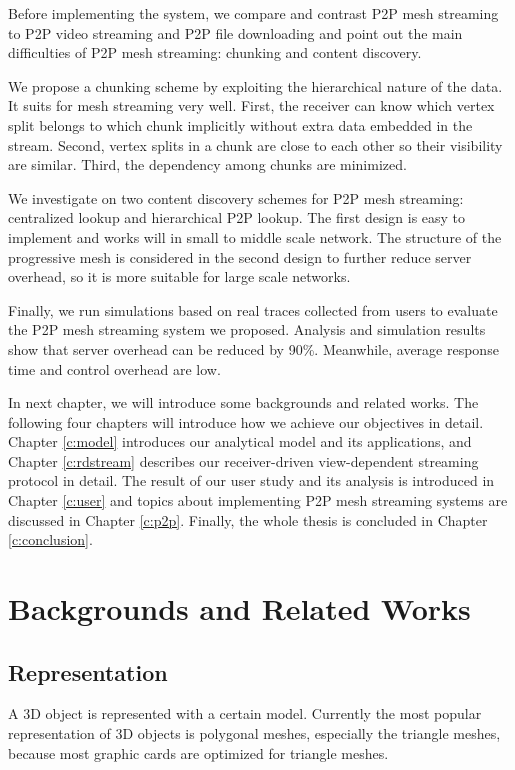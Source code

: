 \documentclass[11pt, a4paper]{report}
\begin{document}
    Before implementing the system, 
    we compare and contrast P2P mesh streaming to P2P
    video streaming and P2P file downloading and point out
    the main difficulties of P2P mesh streaming:  
    chunking and content discovery.

    We propose a chunking scheme by exploiting the hierarchical 
    nature of the data. It suits for mesh streaming very well.
    First, the receiver can know which vertex split belongs to
    which chunk implicitly without extra data embedded in the stream.
    Second, vertex splits in a chunk are close to each other so
    their visibility are similar. Third, the dependency among chunks
    are minimized.

    We investigate on two content discovery schemes for P2P
    mesh streaming: centralized lookup and hierarchical P2P lookup.
    The first design is easy to implement and works will in small to 
    middle scale network. The structure of the progressive
    mesh is considered in the second design to further
    reduce server overhead, so it is more suitable for large scale networks. 
    
    Finally, we run simulations based on real
    traces collected from users to evaluate the P2P
    mesh streaming system we proposed.  Analysis and
    simulation results show that server overhead can be
    reduced by 90\%. Meanwhile,  average response time and
    control overhead are low.

    In next chapter, we will introduce some backgrounds and related works.
    The following four chapters will introduce how we achieve our objectives in detail.
    Chapter \ref{c:model} introduces our analytical model and its applications, and
    Chapter \ref{c:rdstream} describes our receiver-driven view-dependent streaming
    protocol in detail. The result of our user study and its analysis is introduced
    in Chapter \ref{c:user} and topics about implementing P2P mesh streaming systems
    are discussed in Chapter \ref{c:p2p}. Finally, the whole thesis is concluded in
    Chapter \ref{c:conclusion}.

\chapter{Backgrounds and Related Works}
\label{c:related}
    \section{Representation}
    \label{s:related:representation}
    A 3D object is represented with a certain model.
    Currently the most popular representation of 3D objects is polygonal meshes, 
    especially the triangle meshes, because most graphic cards are optimized for triangle meshes. 
\end{document}
